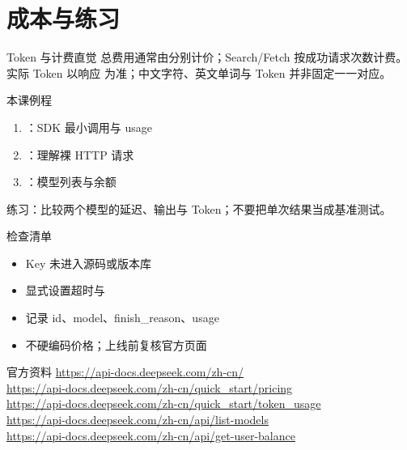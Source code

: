 \documentclass[aspectratio=169,UTF8]{ctexbeamer}
\begin{document}
\section{成本与练习}
\begin{frame}{Token 与计费直觉}
总费用通常由分别计价；Search/Fetch 按成功请求次数计费。\\[8pt]
实际 Token 以响应  为准；中文字符、英文单词与 Token 并非固定一一对应。
\end{frame}
\begin{frame}{本课例程}
\begin{enumerate}
  \item {}：SDK 最小调用与 usage
  \item {}：理解裸 HTTP 请求
  \item {}：模型列表与余额
\end{enumerate}
练习：比较两个模型的延迟、输出与 Token；不要把单次结果当成基准测试。
\end{frame}
\begin{frame}{检查清单}
\begin{itemize}
  \item Key 未进入源码或版本库
  \item 显式设置超时与 
  \item 记录 id、model、finish\_reason、usage
  \item 不硬编码价格；上线前复核官方页面
\end{itemize}
\end{frame}
\begin{frame}{官方资料}
\small
\url{https://api-docs.deepseek.com/zh-cn/}\\
\url{https://api-docs.deepseek.com/zh-cn/quick_start/pricing}\\
\url{https://api-docs.deepseek.com/zh-cn/quick_start/token_usage}\\
\url{https://api-docs.deepseek.com/zh-cn/api/list-models}\\
\url{https://api-docs.deepseek.com/zh-cn/api/get-user-balance}
\end{frame}
\end{document}
